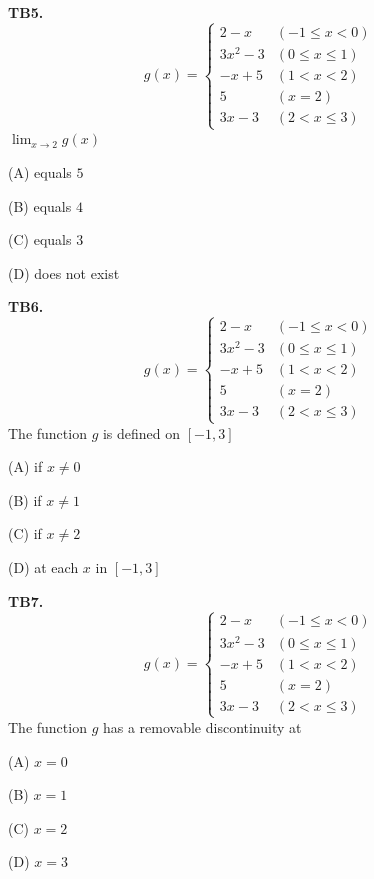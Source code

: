 \documentclass[11pt]{article}
\begin{document}
\bigskip\noindent\textbf{TB5.}\ \[
g(x) = \begin{cases}
2-x & (-1 \leq x < 0) \\
3x^2-3 & (0 \leq x \leq 1) \\
-x+5 & (1 < x < 2) \\
5 & (x = 2) \\
3x-3 & (2 < x \leq 3)
\end{cases}
\]
$\displaystyle\lim_{x\to 2} g(x)$
\begin{list}{}{\setlength{\leftmargin}{3em}\setlength{\labelwidth}{2.5em}\setlength{\itemsep}{0pt}\setlength{\topsep}{2pt}}
\item[(A)] equals $5$
\item[(B)] equals $4$
\item[(C)] equals $3$
\item[(D)] does not exist
\end{list}

\bigskip\noindent\textbf{TB6.}\ \[
g(x) = \begin{cases}
2-x & (-1 \leq x < 0) \\
3x^2-3 & (0 \leq x \leq 1) \\
-x+5 & (1 < x < 2) \\
5 & (x = 2) \\
3x-3 & (2 < x \leq 3)
\end{cases}
\]
The function $g$ is defined on $[-1,3]$
\begin{list}{}{\setlength{\leftmargin}{3em}\setlength{\labelwidth}{2.5em}\setlength{\itemsep}{0pt}\setlength{\topsep}{2pt}}
\item[(A)] if $x \neq 0$
\item[(B)] if $x \neq 1$
\item[(C)] if $x \neq 2$
\item[(D)] at each $x$ in $[-1,3]$
\end{list}

\bigskip\noindent\textbf{TB7.}\ \[
g(x) = \begin{cases}
2-x & (-1 \leq x < 0) \\
3x^2-3 & (0 \leq x \leq 1) \\
-x+5 & (1 < x < 2) \\
5 & (x = 2) \\
3x-3 & (2 < x \leq 3)
\end{cases}
\]
The function $g$ has a removable discontinuity at
\begin{list}{}{\setlength{\leftmargin}{3em}\setlength{\labelwidth}{2.5em}\setlength{\itemsep}{0pt}\setlength{\topsep}{2pt}}
\item[(A)] $x = 0$
\item[(B)] $x = 1$
\item[(C)] $x = 2$
\item[(D)] $x = 3$
\end{list}
\end{document}
